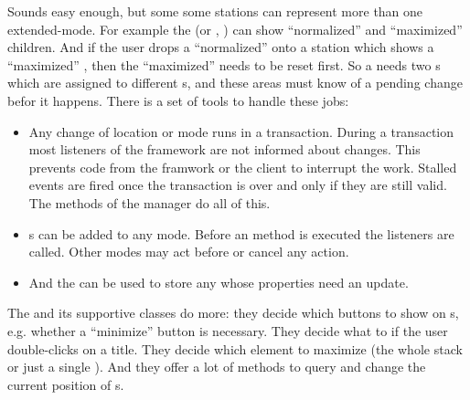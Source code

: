 Sounds easy enough, but some some stations can represent more than one extended-mode. For example the  (or , \linebreak {}) can show ``normalized'' and ``maximized'' children. And if the user drops a ``normalized''  onto a station which shows a ``maximized'' , then the ``maximized''  needs to be reset first. So a  needs two s which are assigned to different s, and these areas must know of a pending change befor it happens. There is a set of tools to handle these jobs:
\begin{itemize}
 \item Any change of location or mode runs in a transaction. During a transaction most listeners of the framework are not informed about changes. This prevents code from the framwork or the client to interrupt the work. Stalled events are fired once the transaction is over and only if they are still valid. The  methods of the manager do all of this.
 \item {}s can be added to any mode. Before an  method is executed the listeners are called. Other modes may act before or cancel any action.
 \item And the  can be used to store any  whose properties need an update.
\end{itemize}

The  and its supportive classes do more: they decide which buttons to show on s, e.g. whether a ``minimize'' button is necessary. They decide what to if the user double-clicks on a title. They decide which element to maximize (the whole stack or just a single ). And they offer a lot of methods to query and change the current position of s.


